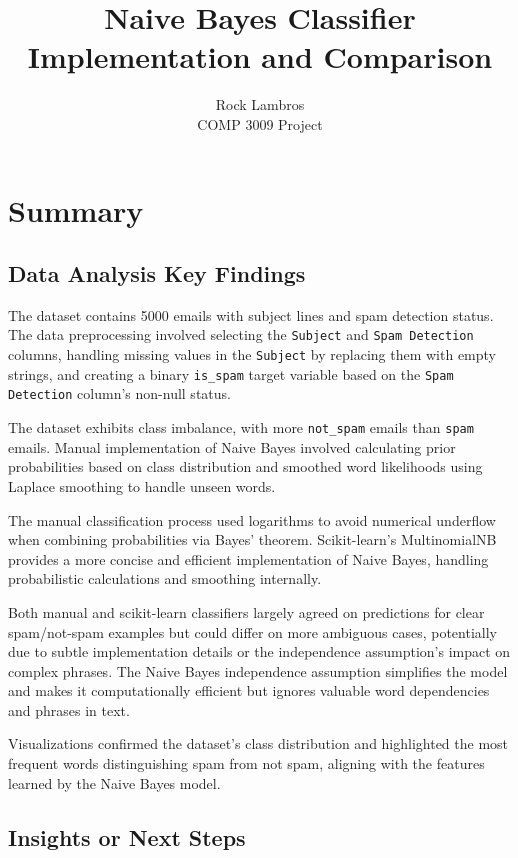 \documentclass[12pt,letterpaper]{article}
\title{Naive Bayes Classifier Implementation and Comparison}
\author{Rock Lambros\\COMP 3009 Project}
\date{}
\begin{document}
\maketitle

\section{Summary}

\subsection{Data Analysis Key Findings}

The dataset contains 5000 emails with subject lines and spam detection status. The data preprocessing involved selecting the \texttt{Subject} and \texttt{Spam Detection} columns, handling missing values in the \texttt{Subject} by replacing them with empty strings, and creating a binary \texttt{is\_spam} target variable based on the \texttt{Spam Detection} column's non-null status.

The dataset exhibits class imbalance, with more \texttt{not\_spam} emails than \texttt{spam} emails. Manual implementation of Naive Bayes involved calculating prior probabilities based on class distribution and smoothed word likelihoods using Laplace smoothing to handle unseen words.

The manual classification process used logarithms to avoid numerical underflow when combining probabilities via Bayes' theorem. Scikit-learn's MultinomialNB provides a more concise and efficient implementation of Naive Bayes, handling probabilistic calculations and smoothing internally.

Both manual and scikit-learn classifiers largely agreed on predictions for clear spam/not-spam examples but could differ on more ambiguous cases, potentially due to subtle implementation details or the independence assumption's impact on complex phrases. The Naive Bayes independence assumption simplifies the model and makes it computationally efficient but ignores valuable word dependencies and phrases in text.

Visualizations confirmed the dataset's class distribution and highlighted the most frequent words distinguishing spam from not spam, aligning with the features learned by the Naive Bayes model.

\subsection{Insights or Next Steps}
\end{document}

